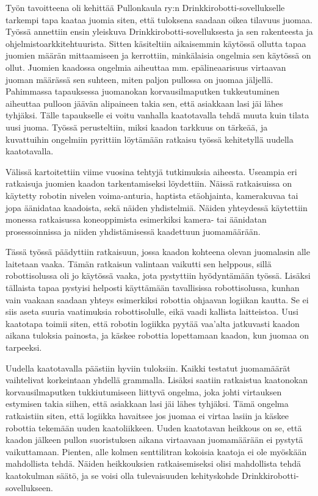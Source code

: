 Työn tavoitteena oli kehittää Pullonkaula ry:n Drinkkirobotti\hyp{}sovellukselle tarkempi tapa kaataa juomia siten, että tuloksena saadaan oikea tilavuus juomaa. Työssä annettiin ensin yleiskuva Drinkkirobotti\hyp{}sovelluksesta ja sen rakenteesta ja ohjelmistoarkkitehtuurista. Sitten käsiteltiin aikaisemmin käytössä ollutta tapaa juomien määrän mittaamiseen ja kerrottiin, minkälaisia ongelmia sen käytössä on ollut. Juomien kaadossa ongelmia aiheuttaa mm. epälineaarisuus virtaavan juoman määrässä sen suhteen, miten paljon pullossa on juomaa jäljellä. Pahimmassa tapauksessa juomanokan korvausilmaputken tukkeutuminen aiheuttaa pulloon jäävän alipaineen takia sen, että asiakkaan lasi jäi lähes tyhjäksi. Tälle tapaukselle ei voitu vanhalla kaatotavalla tehdä muuta kuin tilata uusi juoma. Työssä perusteltiin, miksi kaadon tarkkuus on tärkeää, ja kuvattuihin ongelmiin pyrittiin löytämään ratkaisu työssä kehitetyllä uudella kaatotavalla.

Välissä kartoitettiin viime vuosina tehtyjä tutkimuksia aiheesta. Useampia eri ratkaisuja juomien kaadon tarkentamiseksi löydettiin. Näissä ratkaisuissa on käytetty robotin nivelen voima-anturia, haptista etäohjainta, kamerakuvaa tai jopa äänidataa kaadoista, sekä näiden yhdistelmiä. Näiden yhteydessä käytettiin monessa ratkaisussa koneoppimista esimerkiksi kamera- tai äänidatan prosessoinnissa ja niiden yhdistämisessä kaadettuun juomamäärään.

Tässä työssä päädyttiin ratkaisuun, jossa kaadon kohteena olevan juomalasin alle laitetaan vaaka. Tämän ratkaisun valintaan vaikutti sen helppous, sillä robottisolussa oli jo käytössä vaaka, jota pystyttiin hyödyntämään työssä. Lisäksi tällaista tapaa pystyisi helposti käyttämään tavallisissa robottisolussa, kunhan vain vaakaan saadaan yhteys esimerkiksi robottia ohjaavan logiikan kautta. Se ei siis aseta suuria vaatimuksia robottisolulle, eikä vaadi kallista laitteistoa. Uusi kaatotapa toimii siten, että robotin logiikka pyytää vaa'alta jatkuvasti kaadon aikana tuloksia painosta, ja käskee robottia lopettamaan kaadon, kun juomaa on tarpeeksi.

Uudella kaatotavalla päästiin hyviin tuloksiin. Kaikki testatut juomamäärät vaihtelivat korkeintaan yhdellä grammalla. Lisäksi saatiin ratkaistua kaatonokan korvausilmaputken tukkiutumiseen liittyvä ongelma, joka johti virtauksen estymisen takia siihen, että asiakkaan lasi jäi lähes tyhjäksi. Tämä ongelma ratkaistiin siten, että logiikka havaitsee jos juomaa ei virtaa lasiin ja käskee robottia tekemään uuden kaatoliikkeen. Uuden kaatotavan heikkous on se, että kaadon jälkeen pullon suoristuksen aikana virtaavaan juomamäärään ei pystytä vaikuttamaan. Pienten, alle kolmen senttilitran kokoisia kaatoja ei ole myöskään mahdollista tehdä. Näiden heikkouksien ratkaisemiseksi olisi mahdollista tehdä kaatokulman säätö, ja se voisi olla tulevaisuuden kehityskohde Drinkkirobotti\hyp{}sovellukseen.
